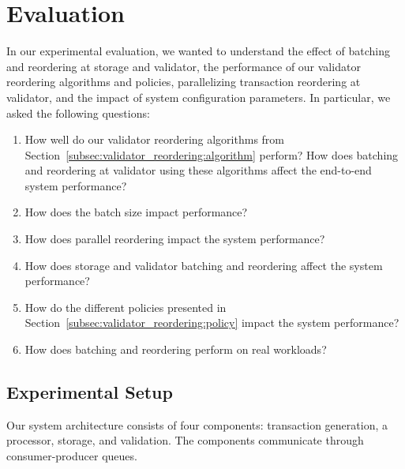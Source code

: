 \section{Evaluation}\label{sec:experiments}
In our experimental evaluation, we wanted to understand the effect of batching and reordering at storage and validator, the performance of our validator reordering algorithms and policies, parallelizing transaction reordering at validator, and the impact of system configuration parameters. In particular, we asked the following questions:
\begin{enumerate}
\item\vspace{-.8em} How well do our validator reordering algorithms from Section~\ref{subsec:validator_reordering:algorithm} perform? How does batching and reordering at validator using these algorithms affect the end-to-end system performance?
\item\vspace{-.8em} How does the batch size impact performance? 
\item\vspace{-.8em} How does parallel reordering impact the system performance?
\item\vspace{-.8em} How does storage and validator batching and reordering affect the system performance?
\item\vspace{-.8em} How do the different policies presented in Section~\ref{subsec:validator_reordering:policy} impact the system performance?
\item\vspace{-.8em} How does batching and reordering perform on real workloads?
\end{enumerate}

\subsection{Experimental Setup}
\label{subsec:experiment:implementation}


Our system architecture consists of four components: transaction generation, a processor, storage, and validation. The components communicate through consumer-producer queues.


